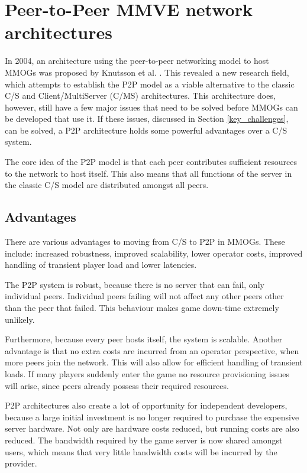 \section{Peer-to-Peer MMVE network architectures}
\label{p2p_network_architectures}

In 2004, an architecture using the peer-to-peer networking model to host MMOGs was proposed by Knutsson et al. \cite{knutsson_p2p_first}. This
revealed a new research field, which attempts to establish the P2P model as a viable alternative to the classic C/S and Client/MultiServer (C/MS)
architectures. This architecture does, however, still have a few major issues that need to be solved before MMOGs can be developed that use it. If
these issues, discussed in Section \ref{key_challenges}, can be solved, a P2P architecture holds some powerful advantages over a C/S system.

The core idea of the P2P model is that each peer contributes sufficient resources to the network to host itself. This also means that all functions
of the server in the classic C/S model are distributed amongst all peers. 

\subsection{Advantages}
\label{p2p_advantages}

There are various advantages to moving from C/S to P2P in MMOGs. These include: increased robustness, improved scalability, lower operator costs,
improved handling of transient player load and lower latencies.

The P2P system is robust, because there is no server that can fail, only individual peers. Individual peers failing will not affect any other peers
other than the peer that failed. This behaviour makes game down-time extremely unlikely.

Furthermore, because every peer hosts itself, the system is scalable. Another advantage is that no extra costs are incurred from an operator
perspective, when more peers join the network. This will also allow for efficient handling of transient loads. If many players suddenly enter the
game no resource provisioning issues will arise, since peers already possess their required resources.

P2P architectures also create a lot of opportunity for independent developers, because a large initial investment is no longer required to purchase
the expensive server hardware. Not only are hardware costs reduced, but running costs are also reduced. The bandwidth required by the game server is
now shared amongst users, which means that very little bandwidth costs will be incurred by the provider.

